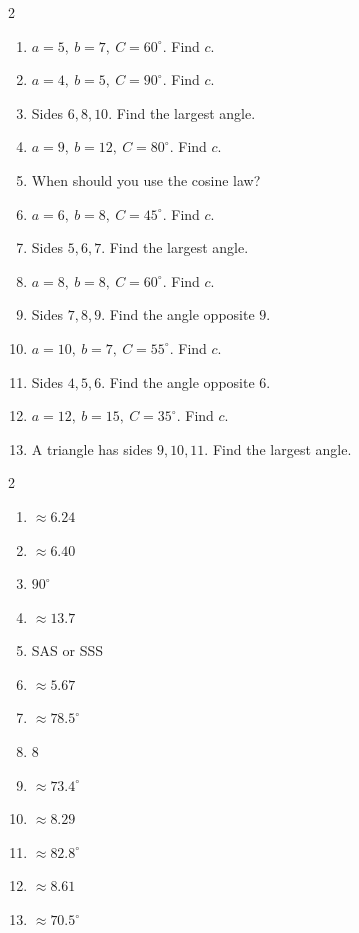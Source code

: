 \documentclass[11pt]{article}
\begin{document}
\begin{recapbox}
\begin{multicols}{2}
\small
\begin{enumerate}[leftmargin=*,itemsep=3pt]
  \item $a=5,\ b=7,\ C=60^\circ$. Find $c$.
  \item $a=4,\ b=5,\ C=90^\circ$. Find $c$.
  \item Sides $6,8,10$. Find the largest angle.
  \item $a=9,\ b=12,\ C=80^\circ$. Find $c$.
  \item When should you use the cosine law?
  \item $a=6,\ b=8,\ C=45^\circ$. Find $c$.
  \item Sides $5,6,7$. Find the largest angle.
  \item $a=8,\ b=8,\ C=60^\circ$. Find $c$.
  \item Sides $7,8,9$. Find the angle opposite $9$.
  \item $a=10,\ b=7,\ C=55^\circ$. Find $c$.
  \item Sides $4,5,6$. Find the angle opposite $6$.
  \item $a=12,\ b=15,\ C=35^\circ$. Find $c$.
  \item A triangle has sides $9,10,11$. Find the largest angle.
\end{enumerate}
\end{multicols}
\end{recapbox}

\begin{keybox}
\begin{multicols}{2}
\small
\begin{enumerate}[leftmargin=*,itemsep=3pt]
  \item $\approx6.24$
  \item $\approx6.40$
  \item $90^\circ$
  \item $\approx13.7$
  \item SAS or SSS
  \item $\approx5.67$
  \item $\approx78.5^\circ$
  \item $8$
  \item $\approx73.4^\circ$
  \item $\approx8.29$
  \item $\approx82.8^\circ$
  \item $\approx8.61$
  \item $\approx70.5^\circ$
\end{enumerate}
\end{multicols}
\end{keybox}
\end{document}
